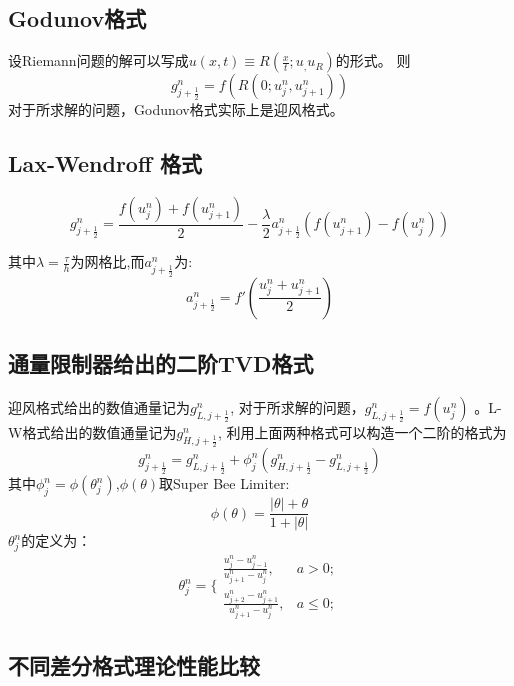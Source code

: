\documentclass[12pt]{article}
\theoremstyle{remark}
\begin{document}
\subsection{Godunov格式}
设Riemann问题的解可以写成$u(x,t)\equiv R(\frac{x}{t};u_,u_R)$的形式。
则
\begin{equation}
g^n_{j+\frac{1}{2}}=f(R(0;u^n_j,u^n_{j+1}))
\end{equation}
对于所求解的问题，Godunov格式实际上是迎风格式。
\subsection{Lax-Wendroff 格式}
\begin{equation}
g^n_{j+\frac{1}{2}}=\frac{f(u^n_j)+f(u^n_{j+1})}{2}-\frac{\lambda}{2}a^n_{j+\frac{1}{2}}(f(u^n_{j+1})-f(u^n_j))
\end{equation}

其中$\lambda=\frac{\tau}{h}$为网格比,而$a^n_{j+\frac{1}{2}}$为:
\begin{equation}
a^n_{j+\frac{1}{2}}=f'(\frac{u^n_j+u^n_{j+1}}{2})
\end{equation}

\subsection{通量限制器给出的二阶TVD格式}
迎风格式给出的数值通量记为$g^n_{L,j+\frac{1}{2}}$,
对于所求解的问题，$g^n_{L,j+\frac{1}{2}}=f(u^n_j)$
。L-W格式给出的数值通量记为$g^n_{H,j+\frac{1}{2}}$,
利用上面两种格式可以构造一个二阶的格式为
\begin{equation}
g^n_{j+\frac{1}{2}}=g^n_{L,j+\frac{1}{2}}+\phi^n_j(g^n_{H,j+\frac{1}{2}}-g^n_{L,j+\frac{1}{2}})
\end{equation}
其中$\phi_j^n=\phi(\theta_j^n)$,$\phi(\theta)$取Super Bee Limiter:
\begin{equation}
\phi(\theta)=\frac{|\theta|+\theta}{1+|\theta|}
\end{equation}
$\theta_j^n$的定义为：
\begin{equation}
\theta^n_j=\Bigg\{\begin{array}{cc}
\frac{u^n_j-u^n_{j-1}}{u^n_{j+1}-u^n_j},&a>0;\\
\frac{u^n_{j+2}-u^n_{j+1}}{u^n_{j+1}-u^n_j},&a\leq 0;
\end{array}
\end{equation}
\subsection{不同差分格式理论性能比较}
\end{document}
